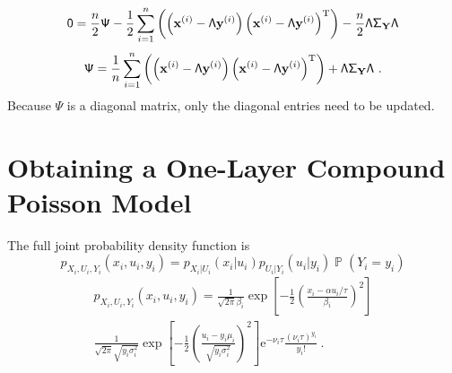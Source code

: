 \documentclass[12pt]{report}
\DeclareMathOperator{\prob}{\mathbb{P}}
\newcommand{\euler}{\mathrm{e}}
\newcommand{\T}{^\textup{T}}
\newcommand{\vect}[1]{\mathbf{#1}}
\newcommand{\matr}[1]{\mathsf{#1}}
\begin{document}
\begin{equation*}
\matr{0} = \frac{n}{2}\matr{\Psi}
-\frac{1}{2}\sum_{i=1}^{n}\left(
\left(\vect{x}^{(i)}-\matr{\Lambda}\vect{y}^{(i)}\right)
\left(\vect{x}^{(i)}-\matr{\Lambda}\vect{y}^{(i)}\right)\T
\right)
-\frac{n}{2}\matr{\Lambda}\matr{\Sigma}_{\vect{Y}}\matr{\Lambda}
\end{equation*}
\begin{equation}
\matr{\Psi} =
\frac{1}{n}\sum_{i=1}^{n}\left(
\left(\vect{x}^{(i)}-\matr{\Lambda}\vect{y}^{(i)}\right)
\left(\vect{x}^{(i)}-\matr{\Lambda}\vect{y}^{(i)}\right)\T
\right)
+\matr{\Lambda}\matr{\Sigma}_{\vect{Y}}\matr{\Lambda}\ .
\end{equation}
Because $\matr{\Psi}$ is a diagonal matrix, only the diagonal entries need to be updated.

\section{Obtaining a One-Layer Compound Poisson Model}\label{chapter:oneLayer_compoundPoisson}
The full joint probability density function is
\begin{equation*}
p_{X_i,U_i,Y_i}\left(x_i,u_i,y_i\right)=
p_{X_i|U_i}(x_i|u_i)p_{U_i|Y_i}(u_i|y_i)\prob(Y_i=y_i)
\end{equation*}
\begin{multline}
p_{X_i,U_i,Y_i}\left(x_i,u_i,y_i\right)=
\frac{1}{\sqrt{2\pi}\beta_i}\exp\left[-\frac{1}{2}\left(\frac{x_i-\alpha u_i /\tau}{\beta_i}\right)^2\right]
\\
\frac{1}{\sqrt{2\pi}\sqrt{y_i\sigma_i^2}}\exp\left[-\frac{1}{2}\left(\frac{u_i-y_i\mu_i}{\sqrt{y_i\sigma_i^2}}\right)^2\right]
\euler^{-\nu_i\tau}\frac{(\nu_i\tau)^{y_i}}{y_i!} \ .
\end{multline}
\end{document}
